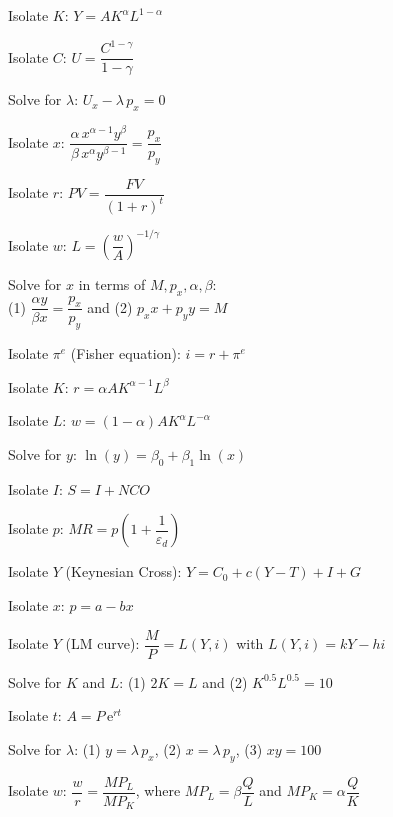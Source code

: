 \begin{problems}
  \item Isolate $K$: \quad $Y = A K^{\alpha} L^{1 - \alpha}$
  \item Isolate $C$: \quad $U = \dfrac{C^{1 - \gamma}}{1 - \gamma}$
  \item Solve for $\lambda$: \quad $U_x - \lambda \, p_x = 0$
  \item Isolate $x$: \quad $\dfrac{\alpha \, x^{\alpha - 1} y^{\beta}}%
        {\beta \, x^{\alpha} y^{\beta - 1}} = \dfrac{p_x}{p_y}$
  \item Isolate $r$: \quad $PV = \dfrac{FV}{(1 + r)^{t}}$
  \item Isolate $w$: \quad $L = \left( \dfrac{w}{A} \right)^{-1/\gamma}$
  \item Solve for $x$ in terms of $M, p_x, \alpha, \beta$: \\
        \quad (1) $\dfrac{\alpha y}{\beta x} = \dfrac{p_x}{p_y}$
        \;and\; (2) $p_x x + p_y y = M$
  \item Isolate $\pi^e$ (Fisher equation): \quad $i = r + \pi^e$
  \item Isolate $K$: \quad $r = \alpha A K^{\alpha - 1} L^{\beta}$
  \item Isolate $L$: \quad $w = (1 - \alpha) A K^{\alpha} L^{-\alpha}$
  \item Solve for $y$: \quad $\ln(y) = \beta_0 + \beta_1 \ln(x)$
  \item Isolate $I$: \quad $S = I + NCO$
  \item Isolate $p$: \quad $MR = p \left(1 + \dfrac{1}{\varepsilon_d}\right)$
  \item Isolate $Y$ (Keynesian Cross): \quad
        $Y = C_0 + c (Y - T) + I + G$
  \item Isolate $x$: \quad $p = a - b x$
  \item Isolate $Y$ (LM curve): \quad $\dfrac{M}{P} = L(Y, i)$
        \;with $L(Y, i) = k Y - h i$
  \item Solve for $K$ and $L$: \;(1) $2 K = L$ and
        (2) $K^{0.5} L^{0.5} = 10$
  \item Isolate $t$: \quad $A = P \, \mathrm{e}^{r t}$
  \item Solve for $\lambda$: \;(1) $y = \lambda \, p_x$,
        \;(2) $x = \lambda \, p_y$, \;(3) $x y = 100$
  \item Isolate $w$: \quad $\dfrac{w}{r} = \dfrac{M P_L}{M P_K}$, where
        $M P_L = \beta \dfrac{Q}{L}$ and $M P_K = \alpha \dfrac{Q}{K}$
\end{problems}

